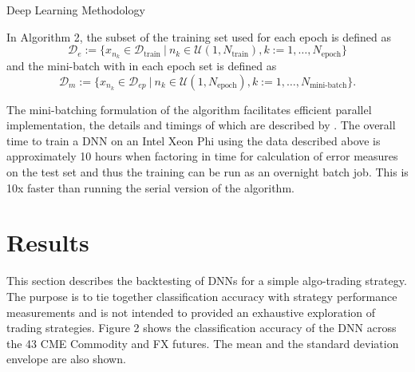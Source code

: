 \documentclass{article}
\newcommand{\be}{\begin{equation}}
\newcommand{\ee}{\end{equation}}
\begin{document}
\begin{algorithm}
\caption{{\sc Deep Learning Methodology}}
\label{algo:deep-learning}
\begin{algorithmic}[1]

 

 
		
			 
        		\EndFor
        		
			 
		\EndFor
	\EndFor
\EndFor
{}
\EndFor
{}
\end{algorithmic}
\end{algorithm}
In Algorithm 2,  the subset of the training set used for each epoch is defined as
\be
\mathcal{D}_e:=\{x_{n_k} \in \mathcal{D}_{\text{train}}~|~n_k\in\mathcal{U}(1,N_{\text{train}}), k:=1,\dots, N_{\text{epoch}}\}
\ee
and the mini-batch with in each epoch set is defined as
\be 
\mathcal{D}_m:=\{x_{n_k} \in \mathcal{D}_{ep}~|~ n_k\in\mathcal{U}(1,N_{\text{epoch}}), k:=1,\dots, N_{\text{mini-batch}}\}.
\ee

The mini-batching formulation of the algorithm facilitates efficient parallel implementation, the details and timings of which are described by \cite{dixon2015}.
The overall time to train a DNN on an Intel Xeon Phi using the data described above is approximately 10 hours when factoring in time for calculation of error measures on the test set and thus the training can be run as an overnight batch job.  This is 10x faster than running the serial version of the algorithm.



\section{Results} \label{sect:results}
This section describes the backtesting of DNNs for a simple algo-trading strategy. The purpose is to tie together classification accuracy with strategy performance measurements and is not intended to provided an exhaustive exploration of trading strategies. Figure 2 shows the classification accuracy of the DNN across the 43 CME Commodity and FX futures. The mean and the standard deviation envelope are also shown.
\end{document}
